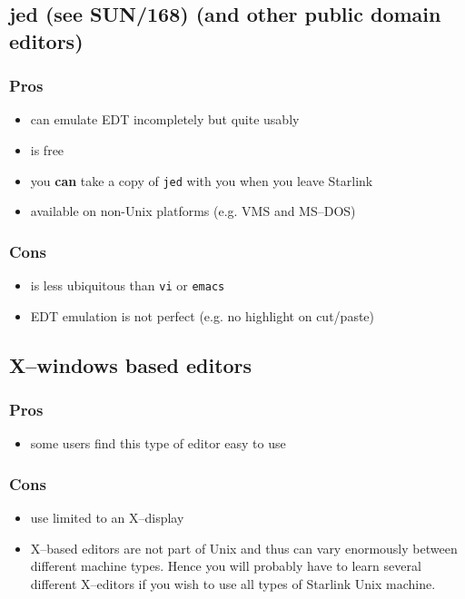 \subsection{jed (see SUN/168) (and other public domain editors)}

\subsubsection*{Pros}

\begin{itemize}
\item can emulate EDT incompletely but quite usably
\item is free
\item you {\bf can} take a copy of \verb|jed| with you when you leave Starlink
\item available on non-Unix platforms (e.g. VMS and MS--DOS)
\end{itemize}

\subsubsection*{Cons}
\begin{itemize}
\item is less ubiquitous than \verb|vi| or \verb|emacs|
\item EDT emulation is not perfect (e.g. no highlight on cut/paste)
\end{itemize}


\subsection{X--windows based editors}

\subsubsection*{Pros}

\begin{itemize}
\item some users find this type of editor easy to use
\end{itemize}

\subsubsection*{Cons}
\begin{itemize}
\item use limited to an X--display
\item X--based editors are not part of Unix and thus can vary
enormously between different machine types. Hence you will probably 
have to learn several different X--editors if you wish to use all 
types of Starlink Unix machine.
\end{itemize}




